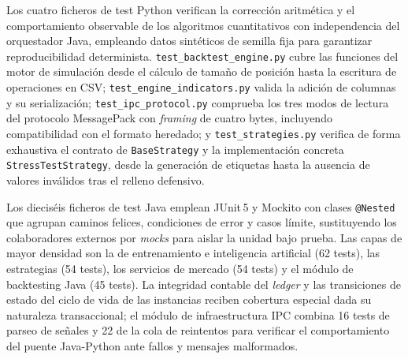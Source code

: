 Los cuatro ficheros de test Python verifican la corrección aritmética y el comportamiento
observable de los algoritmos cuantitativos con independencia del orquestador Java,
empleando datos sintéticos de semilla fija para garantizar reproducibilidad determinista.
\texttt{test\_backtest\_engine.py} cubre las funciones del motor de simulación desde el
cálculo de tamaño de posición hasta la escritura de operaciones en CSV;
\texttt{test\_engine\_indicators.py} valida la adición de columnas y su serialización;
\texttt{test\_ipc\_protocol.py} comprueba los tres modos de lectura del protocolo
MessagePack con \textit{framing} de cuatro bytes, incluyendo compatibilidad con el
formato heredado; y \texttt{test\_strategies.py} verifica de forma exhaustiva el
contrato de \texttt{BaseStrategy} y la implementación concreta
\texttt{StressTestStrategy}, desde la generación de etiquetas hasta la ausencia de
valores inválidos tras el relleno defensivo.

Los dieciséis ficheros de test Java emplean JUnit\,5 y Mockito con clases
\texttt{@Nested} que agrupan caminos felices, condiciones de error y casos límite,
sustituyendo los colaboradores externos por \textit{mocks} para aislar la unidad bajo
prueba. Las capas de mayor densidad son la de entrenamiento e inteligencia artificial
(62 tests), las estrategias (54 tests), los servicios de mercado (54 tests) y el
módulo de backtesting Java (45 tests). La integridad contable del \textit{ledger} y
las transiciones de estado del ciclo de vida de las instancias reciben cobertura
especial dada su naturaleza transaccional; el módulo de infraestructura IPC combina
16 tests de parseo de señales y 22 de la cola de reintentos para verificar el
comportamiento del puente Java-Python ante fallos y mensajes malformados.

